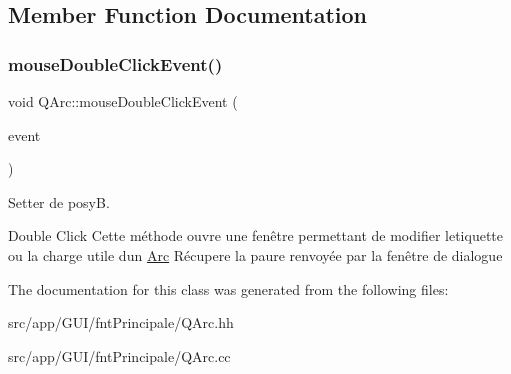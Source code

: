 \subsection{Member Function Documentation}
\mbox{\label{classQArc_a33187e6b256b9a1cbc280f415f3d6152}} 
\subsubsection{\texorpdfstring{mouse\+Double\+Click\+Event()}{mouseDoubleClickEvent()}}
{\footnotesize\ttfamily void Q\+Arc\+::mouse\+Double\+Click\+Event (\begin{DoxyParamCaption}\item[{Q\+Graphics\+Scene\+Mouse\+Event $\ast$}]{event }\end{DoxyParamCaption})}



Setter de posyB. 

Double Click Cette m\'{e}thode ouvre une fen\^{e}tre permettant de modifier l\textquotesingle{}etiquette ou la charge utile d\textquotesingle{}un \hyperlink{classArc}{Arc} R\'{e}cupere la paure renvoy\'{e}e par la fen\^{e}tre de dialogue 

The documentation for this class was generated from the following files\+:\begin{DoxyCompactItemize}
\item 
src/app/\+G\+U\+I/fnt\+Principale/Q\+Arc.\+hh\item 
src/app/\+G\+U\+I/fnt\+Principale/Q\+Arc.\+cc\end{DoxyCompactItemize}
